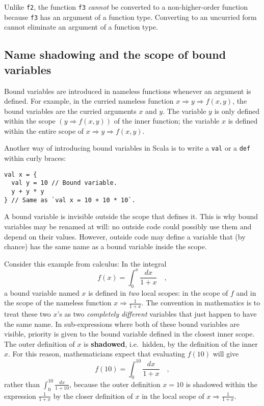 Unlike \lstinline!f2!, the function \lstinline!f3! \emph{cannot}
be converted to a non-higher-order function because \lstinline!f3!
has an argument of a function type. Converting to an uncurried form
cannot eliminate an argument of a function type.

\subsection{Name shadowing and the scope of bound variables}

Bound variables are introduced in nameless functions whenever an argument
is defined. For example, in the curried nameless function $x\Rightarrow y\Rightarrow f(x,y)$,
the bound variables are the curried arguments $x$ and $y$. The variable
$y$ is only defined within the scope $\left(y\Rightarrow f(x,y)\right)$
of the inner function; the variable $x$ is defined within the entire
scope of $x\Rightarrow y\Rightarrow f(x,y)$.

Another way of introducing bound variables in Scala is to write a
\lstinline!val! or a \lstinline!def! within curly braces:
\begin{lstlisting}
val x = {
  val y = 10 // Bound variable.
  y + y * y
} // Same as `val x = 10 + 10 * 10`.
\end{lstlisting}

A bound variable is invisible outside the scope that defines it. This
is why bound variables may be renamed at will: no outside code could
possibly use them and depend on their values. However, outside code
may define a variable that (by chance) has the same name as a bound
variable inside the scope.

Consider this example from calculus: In the integral
\[
f(x)=\int_{0}^{x}\frac{dx}{1+x}\quad,
\]
a bound variable named $x$ is defined in \emph{two} local scopes:
in the scope of $f$ and in the scope of the nameless function $x\Rightarrow\frac{1}{1+x}$.
The convention in mathematics is to treat these two $x$'s as two
\emph{completely} \emph{different} variables that just happen to have
the same name. In sub-expressions where both of these bound variables
are visible, priority is given to the bound variable defined in the
closest inner scope. The outer definition of $x$ is \textbf{shadowed},
i.e.\ hidden, by the definition of the inner $x$. For this reason,
mathematicians expect that evaluating $f(10)$ will give
\[
f(10)=\int_{0}^{10}\frac{dx}{1+x}\quad,
\]
rather than $\int_{0}^{10}\frac{dx}{1+10}$, because the outer definition
$x=10$ is shadowed within the expression $\frac{1}{1+x}$ by the
closer definition of $x$ in the local scope of $x\Rightarrow\frac{1}{1+x}$.

